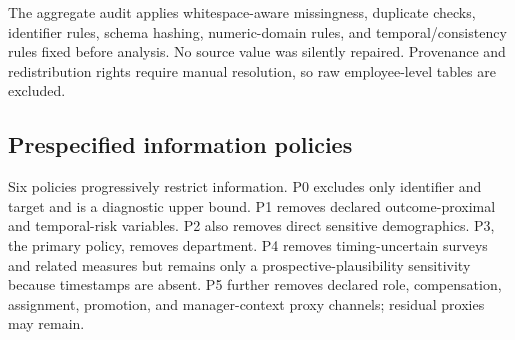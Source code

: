 \documentclass[information,article,submit,pdftex,moreauthors]{Definitions/mdpi}
\begin{document}
The aggregate audit applies whitespace-aware missingness, duplicate checks, identifier rules, schema hashing, numeric-domain rules, and temporal/consistency rules fixed before analysis. No source value was silently repaired. Provenance and redistribution rights require manual resolution, so raw employee-level tables are excluded.

\begin{table}[H]
\centering\scriptsize
\caption{Dataset roles, target mappings, and aggregate audit status}
\label{tab:1}
\end{table}

\subsection{Prespecified information policies}

Six policies progressively restrict information. P0 excludes only identifier and target and is a diagnostic upper bound. P1 removes declared outcome-proximal and temporal-risk variables. P2 also removes direct sensitive demographics. P3, the primary policy, removes department. P4 removes timing-uncertain surveys and related measures but remains only a prospective-plausibility sensitivity because timestamps are absent. P5 further removes declared role, compensation, assignment, promotion, and manager-context proxy channels; residual proxies may remain.
\end{document}
